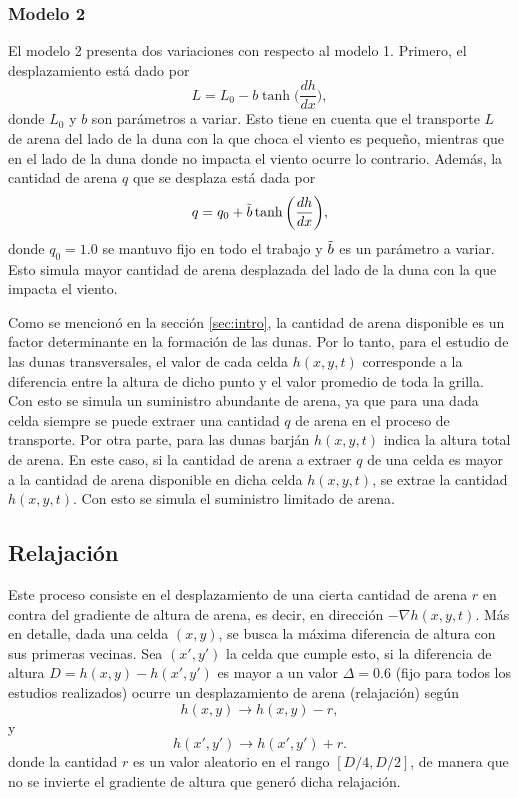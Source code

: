 \documentclass[11pt,twocolumn,twoside]{opticajnl}
\begin{document}
\subsubsection{Modelo 2}

El modelo 2 presenta dos variaciones con respecto al modelo 1. Primero, el desplazamiento está dado por 
\begin{equation}
    L = L_0 - b \tanh{ \biggr( \frac{dh}{dx}  \biggr) },
    \label{ec:Lmodelo2}
\end{equation}
donde $L_0$ y $b$ son parámetros a variar. Esto tiene en cuenta que el transporte $L$ de arena del lado de la duna con la que choca el viento es pequeño, mientras que en el lado de la duna donde no impacta el viento ocurre lo contrario. 
Además, la cantidad de arena $q$ que se desplaza está dada por 
\begin{equation}
q = q_0 + \Tilde{b} \tanh{ \biggr( \frac{dh}{dx} \biggr) },
\label{ec:qmodelo2}
\end{equation}
donde $q_0=1.0$ se mantuvo fijo en todo el trabajo y $\Tilde{b}$ es un parámetro a variar. Esto simula mayor cantidad de arena desplazada del lado de la duna con la que impacta el viento. 

Como se mencionó en la sección \ref{sec:intro}, la cantidad de arena disponible es un factor determinante en la formación de las dunas. Por lo tanto, para el estudio de las dunas transversales, el valor de cada celda $h(x,y,t)$ corresponde a la diferencia entre la altura de dicho punto y el valor promedio de toda la grilla. Con esto se simula un suministro abundante de arena, ya que para una dada celda siempre se puede extraer una cantidad $q$ de arena en el proceso de transporte. Por otra parte, para las dunas barján $h(x,y,t)$ indica la altura total de arena. En este caso, si la cantidad de arena a extraer $q$ de una celda es mayor a la cantidad de arena disponible en dicha celda $h(x,y,t)$, se extrae la cantidad $h(x,y,t)$. Con esto se simula el suministro limitado de arena. 

\subsection{Relajación}

Este proceso consiste en el desplazamiento de una cierta cantidad de arena $r$ en contra del gradiente de altura de arena, es decir, en dirección $-\nabla h(x,y,t)$. Más en detalle, dada una celda $(x,y)$, se busca la máxima diferencia de altura con sus primeras vecinas. Sea $(x',y')$ la celda que cumple esto, si la diferencia de altura $D = h(x,y) - h(x',y')$ es mayor a un valor $\Delta = 0.6$ (fijo para todos los estudios realizados) ocurre un desplazamiento de arena (relajación) según
\begin{equation}
    h(x,y) \rightarrow h(x,y) - r,
\end{equation}
y 
\begin{equation}
    h(x',y') \rightarrow h(x',y') + r.
\end{equation}
donde la cantidad $r$ es un valor aleatorio en el rango $[D/4, D/2]$, de manera que no se invierte el gradiente de altura que generó dicha relajación. 
\end{document}
